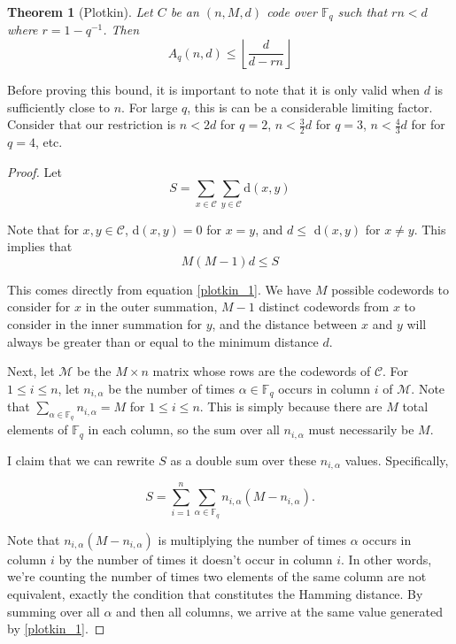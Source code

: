 \documentclass{article}
\theoremstyle{plain}
\newtheorem{theorem}{Theorem}[section]
\theoremstyle{definition}
\begin{document}
\begin{theorem}[Plotkin]
Let $C$ be an $(n,M,d)$ code over $\mathbb{F}_q$ such that $rn < d$ where $r = 1 - q^{-1}$.  Then
\begin{equation}
A_q(n,d) \le \left \lfloor \frac{d}{d-rn}\right\rfloor
\end{equation}
\end{theorem}

Before proving this bound, it is important to note that it is only valid when $d$ is sufficiently close to $n$.  For large $q$, this is can be a considerable limiting factor.
Consider that our restriction is $n<2d$ for $q=2$, $n<\frac{3}{2}d$ for $q=3$, $n<\frac{4}{3}d$ for for $q=4$, etc.


\begin{proof}
Let 
\begin{equation} \label{plotkin_1}
S = \sum_{x \in \mathcal{C}} \sum_{y \in \mathcal{C}} \text{d}(x,y)
\end{equation}

Note that for $x,y \in \mathcal{C}$, d$(x,y)=0$ for $x=y$, and $d \le$ d$(x,y)$ for $x\neq y$.  This implies that
\begin{equation} \label{plotkin_1_5}
M(M-1)d\le S
\end{equation}

This comes directly from equation \ref{plotkin_1}.  We have $M$ possible codewords to consider for $x$ in the outer summation, $M-1$ distinct codewords from $x$ to consider in the inner summation for $y$, 
and the distance between $x$ and $y$ will always be greater than or equal to the minimum distance $d$.

Next, let $\mathcal{M}$ be the $M \times n$ matrix whose rows are the codewords of $\mathcal{C}$.  For $1 \le i \le n$, let $n_{i,\alpha}$ be the number of times $\alpha \in
 \mathbb{F}_q$ occurs in column $i$ of $\mathcal{M}$.  Note that $\sum_{\alpha \in \mathbb{F}_q} n_{i,\alpha} = M$ for $1\le i \le n$.  This is simply because there are $M$ total
 elements of $\mathbb{F}_q$ in each column, so the sum over all $n_{i,\alpha}$ must necessarily be $M$.  

I claim that we can rewrite $S$ as a double sum over these $n_{i,\alpha}$ values.  Specifically,

\begin{equation}
S = \sum_{i=1}^{n} \sum_{\alpha\in\mathbb{F}_q} n_{i,\alpha}(M - n_{i,\alpha}).
\end{equation}

Note that $n_{i,\alpha}(M - n_{i,\alpha})$ is multiplying the number of times $\alpha$ occurs in column $i$ by the number of times it doesn't occur in column $i$.  In other words, we're counting the number of times two elements of the same
column are not equivalent, exactly the condition that constitutes the Hamming distance.   By summing over all $\alpha$ and then all columns, we arrive at the same value generated by \ref{plotkin_1}.


\end{proof}
\end{document}

